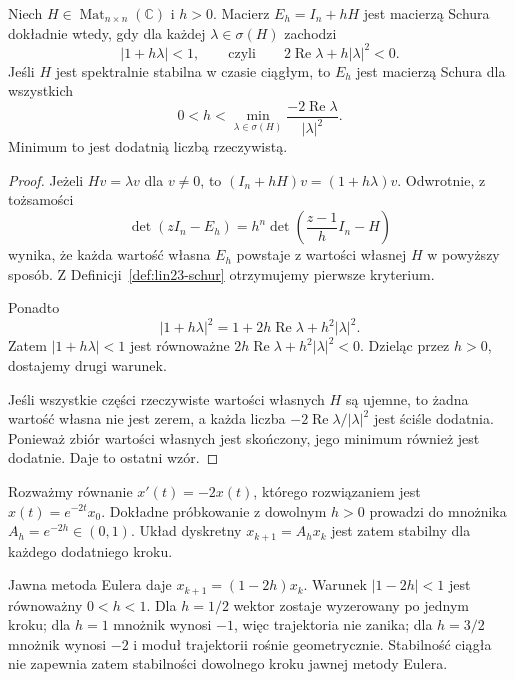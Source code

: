 \begin{stwierdzenie}
\label{prop:lin23-euler}
Niech
\(H\in\operatorname{Mat}_{n\times n}(\mathbb C)\)
i \(h>0\).
Macierz \(E_h=I_n+hH\)
jest macierzą Schura
dokładnie wtedy, gdy
dla każdej
\(\lambda\in\sigma(H)\)
zachodzi
\[
 |1+h\lambda|<1,
 \qquad\text{czyli}\qquad
 2\operatorname{Re}\lambda+h|\lambda|^2<0.
\]
Jeśli \(H\) jest spektralnie
stabilna w czasie ciągłym,
to \(E_h\) jest macierzą Schura
dla wszystkich
\[
 0<h<
 \min_{\lambda\in\sigma(H)}
     \frac{-2\operatorname{Re}\lambda}{|\lambda|^2}.
\]
Minimum to jest
dodatnią liczbą rzeczywistą.
\end{stwierdzenie}
\begin{proof}
Jeżeli \(Hv=\lambda v\)
dla \(v\ne0\), to
\((I_n+hH)v=(1+h\lambda)v\).
Odwrotnie, z tożsamości
\[
 \det(zI_n-E_h)
 =h^n\det\!\left(
       \frac{z-1}{h}I_n-H\right)
\]
wynika, że każda wartość
własna \(E_h\) powstaje
z wartości własnej \(H\)
w powyższy sposób.
Z Definicji~\ref{def:lin23-schur}
otrzymujemy pierwsze kryterium.

Ponadto
\[
 |1+h\lambda|^2
 =1+2h\operatorname{Re}\lambda
     +h^2|\lambda|^2.
\]
Zatem \(|1+h\lambda|<1\)
jest równoważne
\(2h\operatorname{Re}\lambda
 +h^2|\lambda|^2<0\).
Dzieląc przez \(h>0\),
dostajemy drugi warunek.

Jeśli wszystkie części
rzeczywiste wartości własnych
\(H\) są ujemne, to żadna
wartość własna nie jest zerem,
a każda liczba
\(-2\operatorname{Re}\lambda/|\lambda|^2\)
jest ściśle dodatnia.
Ponieważ zbiór wartości własnych
jest skończony, jego minimum
również jest dodatnie.
Daje to ostatni wzór.
\end{proof}

\begin{przyklad}
\label{prz:lin23-euler}
Rozważmy równanie
\(x'(t)=-2x(t)\),
którego rozwiązaniem jest
\(x(t)=e^{-2t}x_0\).
Dokładne próbkowanie
z dowolnym \(h>0\)
prowadzi do mnożnika
\(A_h=e^{-2h}\in(0,1)\).
Układ dyskretny
\(x_{k+1}=A_hx_k\)
jest zatem stabilny
dla każdego dodatniego kroku.

Jawna metoda Eulera daje
\(x_{k+1}=(1-2h)x_k\).
Warunek \(|1-2h|<1\)
jest równoważny \(0<h<1\).
Dla \(h=1/2\) wektor
zostaje wyzerowany
po jednym kroku;
dla \(h=1\) mnożnik
wynosi \(-1\), więc
trajektoria nie zanika;
dla \(h=3/2\) mnożnik
wynosi \(-2\) i moduł trajektorii
rośnie geometrycznie.
Stabilność ciągła nie zapewnia
zatem stabilności dowolnego
kroku jawnej metody Eulera.
\end{przyklad}

